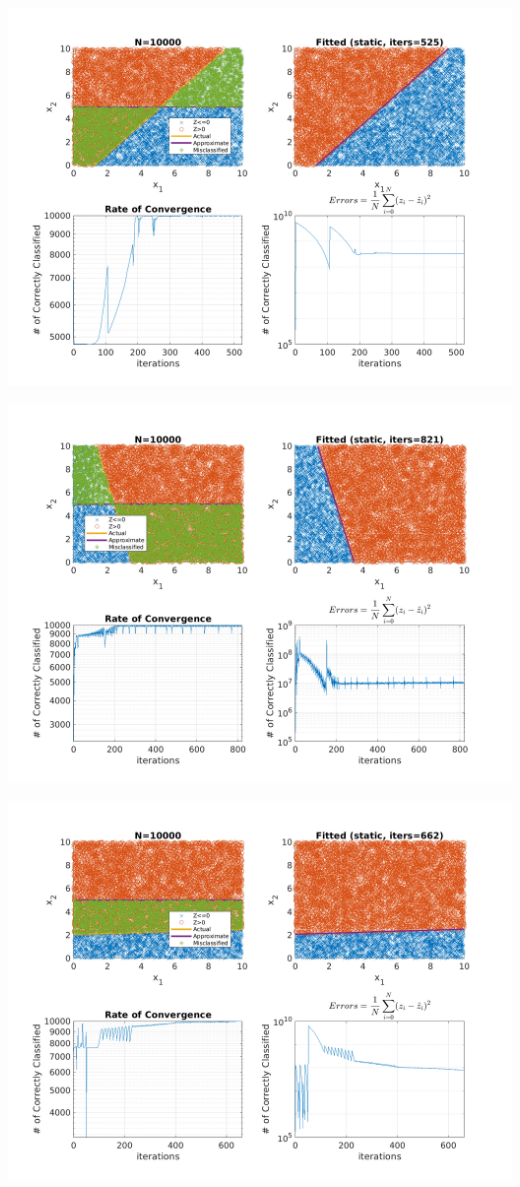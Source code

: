 \documentclass{article}
\newenvironment{Figure}
  {\par\medskip\noindent\minipage{\linewidth}}
  {\endminipage\par\medskip}
\begin{document}
\begin{multicols}{2}
\begin{Figure}
\centering
\includegraphics[width=\linewidth]{pngs/n10000_static1.png}
\end{Figure}
\begin{Figure}
\centering
\includegraphics[width=\linewidth]{pngs/n10000_static2.png}
\end{Figure}
\begin{Figure}
\centering
\includegraphics[width=\linewidth]{pngs/n10000_static3.png}

\end{Figure}
\end{multicols}
\end{document}
